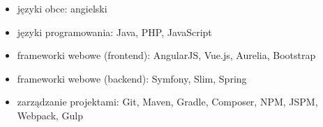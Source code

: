 \documentclass[twoside]{praca}
\begin{document}
\begin{itemize}
\item języki obce: angielski
\item języki programowania: Java, PHP, JavaScript
\item frameworki webowe (frontend): AngularJS, Vue.js, Aurelia, Bootstrap
\item frameworki webowe (backend): Symfony, Slim, Spring
\item zarządzanie projektami: Git, Maven, Gradle, Composer, NPM, JSPM, Webpack, Gulp
\end{itemize}

%
%
\end{document}
